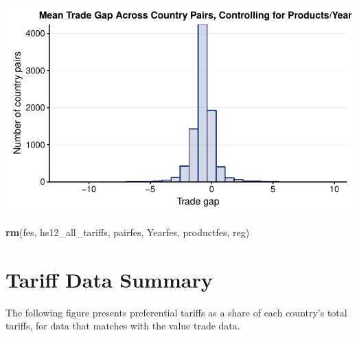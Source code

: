 \documentclass[10pt,]{article}
\newenvironment{Shaded}{\begin{snugshade}}{\end{snugshade}}
\newcommand{\KeywordTok}[1]{\textcolor[rgb]{0.13,0.29,0.53}{\textbf{{#1}}}}
\newcommand{\NormalTok}[1]{{#1}}
\begin{document}
\begin{center}\includegraphics{Figs/value_summary-12} \end{center}

\begin{Shaded}
\begin{Highlighting}[]
\KeywordTok{rm}\NormalTok{(fes, hs12_all_tariffs, pairfes, Yearfes, productfes, reg)}
\end{Highlighting}
\end{Shaded}

\section{Tariff Data Summary}\label{tariff-data-summary}

The following figure presents preferential tariffs as a share of each
country's total tariffs, for data that matches with the value trade
data.
\end{document}
